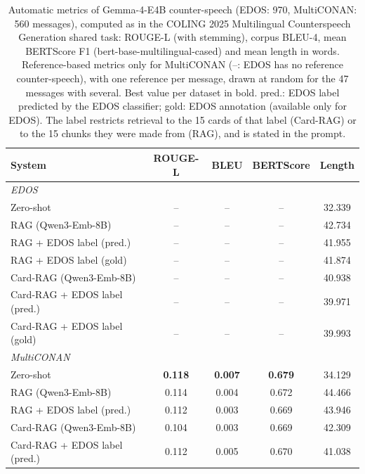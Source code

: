 \begin{table}[t]
\centering
\small
\caption{Automatic metrics of Gemma-4-E4B counter-speech (EDOS: 970, MultiCONAN: 560 messages), computed as in the COLING 2025 Multilingual Counterspeech Generation shared task: ROUGE-L (with stemming), corpus BLEU-4, mean BERTScore F1 (bert-base-multilingual-cased) and mean length in words. Reference-based metrics only for MultiCONAN (--: EDOS has no reference counter-speech), with one reference per message, drawn at random for the 47 messages with several. Best value per dataset in bold. pred.: EDOS label predicted by the EDOS classifier; gold: EDOS annotation (available only for EDOS). The label restricts retrieval to the 15 cards of that label (Card-RAG) or to the 15 chunks they were made from (RAG), and is stated in the prompt.}
\label{tab:automatic-metrics}
\begin{tabular}{lcccc}
\toprule
\textbf{System} & \textbf{ROUGE-L} & \textbf{BLEU} & \textbf{BERTScore} & \textbf{Length} \\
\midrule
\multicolumn{5}{l}{\textit{EDOS}} \\
Zero-shot & -- & -- & -- & 32.339 \\
RAG (Qwen3-Emb-8B) & -- & -- & -- & 42.734 \\
RAG + EDOS label (pred.) & -- & -- & -- & 41.955 \\
RAG + EDOS label (gold) & -- & -- & -- & 41.874 \\
Card-RAG (Qwen3-Emb-8B) & -- & -- & -- & 40.938 \\
Card-RAG + EDOS label (pred.) & -- & -- & -- & 39.971 \\
Card-RAG + EDOS label (gold) & -- & -- & -- & 39.993 \\
\midrule
\multicolumn{5}{l}{\textit{MultiCONAN}} \\
Zero-shot & \textbf{0.118} & \textbf{0.007} & \textbf{0.679} & 34.129 \\
RAG (Qwen3-Emb-8B) & 0.114 & 0.004 & 0.672 & 44.466 \\
RAG + EDOS label (pred.) & 0.112 & 0.003 & 0.669 & 43.946 \\
Card-RAG (Qwen3-Emb-8B) & 0.104 & 0.003 & 0.669 & 42.309 \\
Card-RAG + EDOS label (pred.) & 0.112 & 0.005 & 0.670 & 41.038 \\
\bottomrule
\end{tabular}
\end{table}

